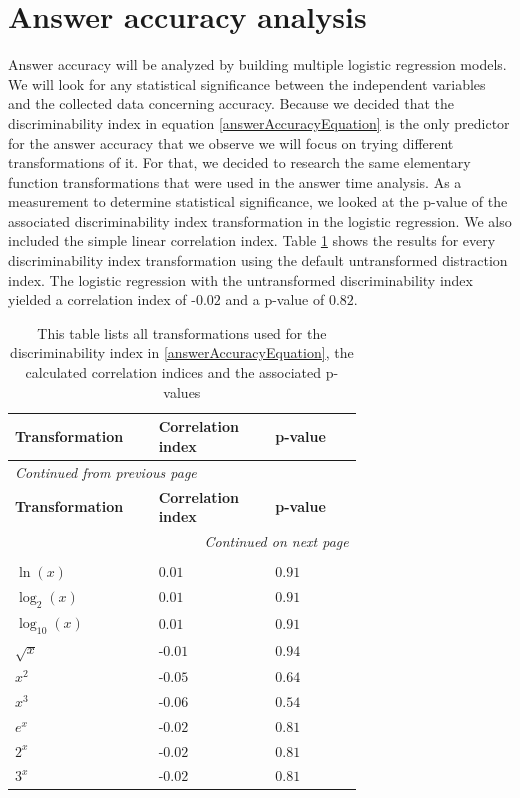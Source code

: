 \section{Answer accuracy analysis}
Answer accuracy will be analyzed by building multiple logistic regression models. We will look for any statistical significance between the independent
variables and the collected data concerning accuracy. Because we decided that the discriminability index in equation \ref{answerAccuracyEquation}
is the only predictor for the answer accuracy that we observe we will focus on trying different transformations of it.
For that, we decided to research the same elementary function transformations that were used in the answer time
analysis. As a measurement to determine statistical significance, we looked at the p-value of the associated discriminability index transformation
in the logistic regression. We also included the simple linear correlation index. Table \ref{discriminabilityIndexTransformation} shows
the results for every discriminability index transformation using the default untransformed distraction index.
The logistic regression with the untransformed discriminability index yielded a correlation index of -$0.02$ and a p-value of $0.82$.
\begin{longtable}{| p{0.24\linewidth} | p{0.25\linewidth} | p{0.20\linewidth}|}
    \hline
    \textbf{Transformation} & \textbf{Correlation index} & \textbf{p-value} \\
    \hline
    \endfirsthead
    \multicolumn{3}{l}{{\textit{Continued from previous page}}} \\
    \hline
    \textbf{Transformation} & \textbf{Correlation index} & \textbf{p-value} \\
    \hline
    \endhead
    \hline \multicolumn{3}{r}{{\textit{Continued on next page}}} \\
    \endfoot
    \hline
    \caption{This table lists all transformations used for the discriminability index in \ref{answerAccuracyEquation}, the calculated correlation indices and the associated p-values \label{discriminabilityIndexTransformation}}\\
    \endlastfoot
    $ \ln(x) $ & $0.01$ & $0.91$ \\
    \hline
    $ \log_{2}(x) $ & $0.01$ & $0.91$ \\
    \hline
    $ \log_{10}(x) $ & $0.01$ & $0.91$ \\
    \hline
    $ \sqrt{x} $ & -$0.01$ & $0.94$ \\
    \hline
    $ x^2 $ & -$0.05$ & $0.64$ \\
    \hline
    $ x^3 $ & -$0.06$ & $0.54$ \\
    \hline
    $ e^x $ & -$0.02$ & $0.81$ \\
    \hline
    $ 2^x $ & -$0.02$ & $0.81$ \\
    \hline
    $ 3^x $ & -$0.02$ & $0.81$ \\
\end{longtable}

